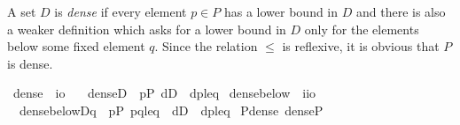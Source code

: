 A set $D$ is \emph{dense} if every element $p\in P$ has a lower bound
in $D$ and there is also a weaker definition which asks for a lower
bound in $D$ only for the elements below some fixed element $q$. Since
the relation $\leqslant$ is reflexive, it is obvious that $P$ is
dense.
\begin{isabelle}
  \isamarkupfalse%
\ dense\ {\isacharcolon}{\isacharcolon}\ {\isachardoublequoteopen}i{\isasymRightarrow}o{\isachardoublequoteclose}\ \isanewline
\ \ {\isachardoublequoteopen}dense{\isacharparenleft}D{\isacharparenright}\ {\isacharequal}{\isacharequal}\ {\isasymforall}p{\isasymin}P{\isachardot}\ {\isasymexists}d{\isasymin}D\ {\isachardot}\ {\isasymlangle}d{\isacharcomma}p{\isasymrangle}{\isasymin}leq{\isachardoublequoteclose}\isanewline
\isanewline
{}\isamarkupfalse%
\ dense{\isacharunderscore}below\ {\isacharcolon}{\isacharcolon}\ {\isachardoublequoteopen}i{\isasymRightarrow}i{\isasymRightarrow}o{\isachardoublequoteclose}\ \isanewline
\ \ {\isachardoublequoteopen}dense{\isacharunderscore}below{\isacharparenleft}D{\isacharcomma}q{\isacharparenright}\ {\isacharequal}{\isacharequal}\ {\isasymforall}p{\isasymin}P{\isachardot}\ {\isasymlangle}p{\isacharcomma}q{\isasymrangle}{\isasymin}leq\ {\isasymlongrightarrow}\ {\isacharparenleft}{\isasymexists}d{\isasymin}D\ {\isachardot}\ {\isasymlangle}d{\isacharcomma}p{\isasymrangle}{\isasymin}leq{\isacharparenright}{\isachardoublequoteclose}\isanewline
\isanewline
{}\isamarkupfalse%
\ P{\isacharunderscore}dense{\isacharcolon}\ {\isachardoublequoteopen}dense{\isacharparenleft}P{\isacharparenright}{\isachardoublequoteclose}
\end{isabelle}

